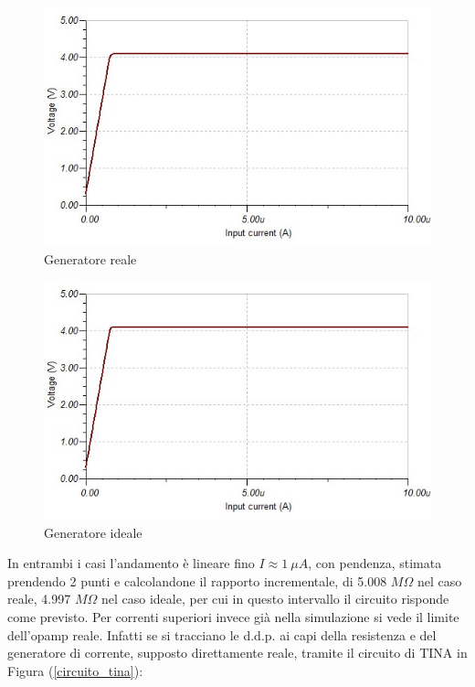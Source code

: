 \documentclass[journal, a4paper]{IEEEtran}
\begin{document}
\begin{figure}[htp]
\centering
\includegraphics[scale=.35]{convertitore_analysis}
\caption{Generatore reale}
\label{gen_rel}
\end{figure}

\begin{figure}[htp]
\centering
\includegraphics[scale=.35]{convertitore_analysis_infinite}
\caption{Generatore ideale\\}
\label{gen_id}
\end{figure}

In entrambi i casi l'andamento è lineare fino $I\approx 1~\mu A$, con pendenza, stimata prendendo 2 punti e calcolandone il rapporto incrementale, di 5.008 $M\Omega$ nel caso reale, 4.997 $M\Omega$ nel caso ideale, per cui in questo intervallo il circuito risponde come previsto. Per correnti superiori invece già nella simulazione si vede il limite dell'opamp reale. Infatti se si tracciano le d.d.p. ai capi della resistenza e del generatore di corrente, supposto direttamente reale, tramite il circuito di TINA in Figura (\ref{circuito_tina}):
\end{document}
